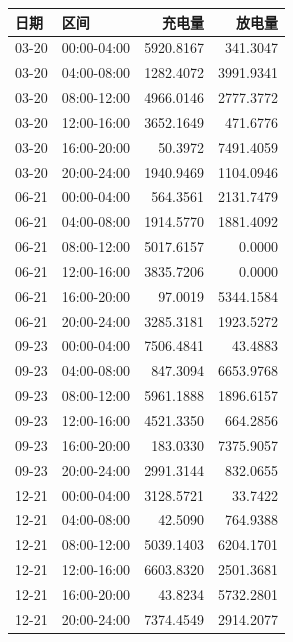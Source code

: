 \begin{tabular}{llrr}
\toprule
日期 & 区间 & 充电量 & 放电量 \\
\midrule
03-20 & 00:00-04:00 & 5920.8167 & 341.3047 \\
03-20 & 04:00-08:00 & 1282.4072 & 3991.9341 \\
03-20 & 08:00-12:00 & 4966.0146 & 2777.3772 \\
03-20 & 12:00-16:00 & 3652.1649 & 471.6776 \\
03-20 & 16:00-20:00 & 50.3972 & 7491.4059 \\
03-20 & 20:00-24:00 & 1940.9469 & 1104.0946 \\
06-21 & 00:00-04:00 & 564.3561 & 2131.7479 \\
06-21 & 04:00-08:00 & 1914.5770 & 1881.4092 \\
06-21 & 08:00-12:00 & 5017.6157 & 0.0000 \\
06-21 & 12:00-16:00 & 3835.7206 & 0.0000 \\
06-21 & 16:00-20:00 & 97.0019 & 5344.1584 \\
06-21 & 20:00-24:00 & 3285.3181 & 1923.5272 \\
09-23 & 00:00-04:00 & 7506.4841 & 43.4883 \\
09-23 & 04:00-08:00 & 847.3094 & 6653.9768 \\
09-23 & 08:00-12:00 & 5961.1888 & 1896.6157 \\
09-23 & 12:00-16:00 & 4521.3350 & 664.2856 \\
09-23 & 16:00-20:00 & 183.0330 & 7375.9057 \\
09-23 & 20:00-24:00 & 2991.3144 & 832.0655 \\
12-21 & 00:00-04:00 & 3128.5721 & 33.7422 \\
12-21 & 04:00-08:00 & 42.5090 & 764.9388 \\
12-21 & 08:00-12:00 & 5039.1403 & 6204.1701 \\
12-21 & 12:00-16:00 & 6603.8320 & 2501.3681 \\
12-21 & 16:00-20:00 & 43.8234 & 5732.2801 \\
12-21 & 20:00-24:00 & 7374.4549 & 2914.2077 \\
\bottomrule
\end{tabular}
